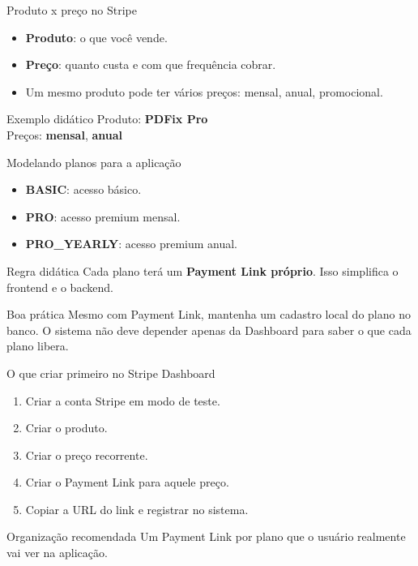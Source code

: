\documentclass[aspectratio=169]{beamer}
\begin{document}
\begin{frame}{Produto x preço no Stripe}
\begin{itemize}
  \item \textbf{Produto}: o que você vende.
  \item \textbf{Preço}: quanto custa e com que frequência cobrar.
  \item Um mesmo produto pode ter vários preços: mensal, anual, promocional.
\end{itemize}

\begin{exampleblock}{Exemplo didático}
Produto: \textbf{PDFix Pro}\\
Preços: \textbf{mensal}, \textbf{anual}
\end{exampleblock}
\end{frame}

\begin{frame}{Modelando planos para a aplicação}
\begin{itemize}
  \item \textbf{BASIC}: acesso básico.
  \item \textbf{PRO}: acesso premium mensal.
  \item \textbf{PRO\_YEARLY}: acesso premium anual.
\end{itemize}

\begin{block}{Regra didática}
Cada plano terá um \textbf{Payment Link próprio}. Isso simplifica o frontend e o backend.
\end{block}

\begin{alertblock}{Boa prática}
Mesmo com Payment Link, mantenha um cadastro local do plano no banco. O sistema não deve depender apenas da Dashboard para saber o que cada plano libera.
\end{alertblock}
\end{frame}

\begin{frame}{O que criar primeiro no Stripe Dashboard}
\begin{enumerate}
  \item Criar a conta Stripe em modo de teste.
  \item Criar o produto.
  \item Criar o preço recorrente.
  \item Criar o Payment Link para aquele preço.
  \item Copiar a URL do link e registrar no sistema.
\end{enumerate}

\begin{exampleblock}{Organização recomendada}
Um Payment Link por plano que o usuário realmente vai ver na aplicação.
\end{exampleblock}
\end{frame}
\end{document}
